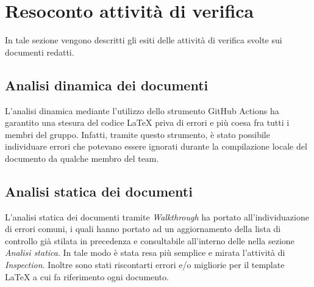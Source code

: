 \section{Resoconto attività di verifica}
In tale sezione vengono descritti gli esiti delle attività di verifica svolte sui documenti redatti.

\subsection{Analisi dinamica dei documenti}
L'analisi dinamica mediante l'utilizzo dello strumento GitHub Actions ha garantito una stesura del codice \LaTeX{} priva di errori e più coesa fra tutti i membri del gruppo. Infatti, tramite questo strumento, è stato possibile individuare errori che potevano essere ignorati durante la compilazione locale del documento da qualche membro del team.

\subsection{Analisi statica dei documenti}
L'analisi statica dei documenti tramite \textit{Walkthrough} ha portato all'individuazione di errori comuni, i quali hanno portato ad un aggiornamento della lista di controllo già stilata in precedenza e consultabile all'interno delle \NdPv{} nella sezione \textit{Analisi statica}. In tale modo è stata resa più semplice e mirata l'attività di \textit{Inspection}. Inoltre sono stati riscontarti errori e/o migliorie per il template \LaTeX{} a cui fa riferimento ogni documento.

